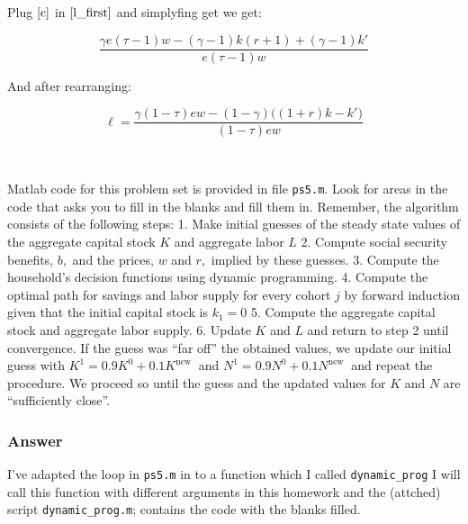 \documentclass[10pt,notitlepage,onecolumn,aps,pra]{revtex4-1}
\begin{document}
Plug \(\eqref{c}\) in \(\eqref{l_first}\) and simplyfing get we get:

\begin{equation}\label{eq:l_not_final}
\frac{\gamma  e (\tau -1) w-(\gamma -1) k
   (r+1)+(\gamma -1) k'}{e (\tau -1)
   w}
\end{equation}

And after rearranging:

\begin{equation}\label{eq:l_final}
\boxed{\ell = \frac{\gamma   (1-\tau) ew-(1-\gamma)\big(
   (1+r)k-k'\big)}{(1-\tau)e w}}
\end{equation}

    \hypertarget{quad}{%
\subsection{\texorpdfstring{\(\quad\)}{\textbackslash quad}}\label{quad}}

Matlab code for this problem set is provided in file \texttt{ps5.m}.
Look for areas in the code that asks you to fill in the blanks and fill
them in. Remember, the algorithm consists of the following steps: 1.
Make initial guesses of the steady state values of the aggregate capital
stock \(K\) and aggregate labor \(L\) 2. Compute social security
benefits, \(b,\) and the prices, \(w\) and \(r,\) implied by these
guesses. 3. Compute the household's decision functions using dynamic
programming. 4. Compute the optimal path for savings and labor supply
for every cohort \(j\) by forward induction given that the initial
capital stock is \(k_{1}=0\) 5. Compute the aggregate capital stock and
aggregate labor supply. 6. Update \(K\) and \(L\) and return to step 2
until convergence. If the guess was ``far off'' the obtained values, we
update our initial guess with \(K^{1}=0.9 K^{0}+0.1 K^{\text {new }}\)
and \(N^{1}=0.9 N^{0}+0.1 N^{\text {new }}\) and repeat the procedure.
We proceed so until the guess and the updated values for \(K\) and \(N\)
are ``sufficiently close''.

    \hypertarget{answer}{%
\subsubsection{Answer}\label{answer}}

    I've adapted the loop in \texttt{ps5.m} in to a function which I called
\texttt{dynamic\_prog} I will call this function with different
arguments in this homework and the (attched) script
\texttt{dynamic\_prog.m}; contains the code with the blanks filled.
\end{document}
